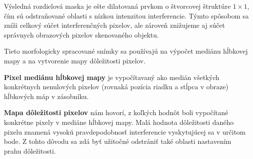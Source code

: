 Výsledná rozdielová maska je ešte dilatovaná prvkom o štvorcovej štruktúre $ 1 \times1 $, čím sú odstraňované oblasti s nízkou intenzitou interferencie. Týmto spôsobom sa zníži celkový súčet interferenčných pixelov, ale zároveň znižujeme aj súčet správnych obrazových pixelov skenovaného objektu. 

Tieto morfologicky spracované snímky sa používajú na výpočet mediánu hĺbkovej mapy a na vytvorenie mapy dôležitosti pixelov.\newline


\textbf{Pixel mediánu hĺbkovej mapy} je vypočítavaný ako medián všetkých konkrétnych nenulových pixelov (rovnaká pozícia riadku a stĺpca v obraze) hĺbkových máp v zásobníku. \newline

\textbf{Mapa dôležitosti pixelov} nám hovorí, z koľkých hodnôt boli vypočítané konkrétne pixely v mediáne hĺbkovej mapy.  Malá hodnota dôležitosti daného pixelu znamená vysokú pravdepodobnosť interferencie vyskytujúcej sa v určitom bode. Z tohto dôvodu sa zdá byť užitočné odstrániť také oblasti nastavením prahu dôležitosti.


